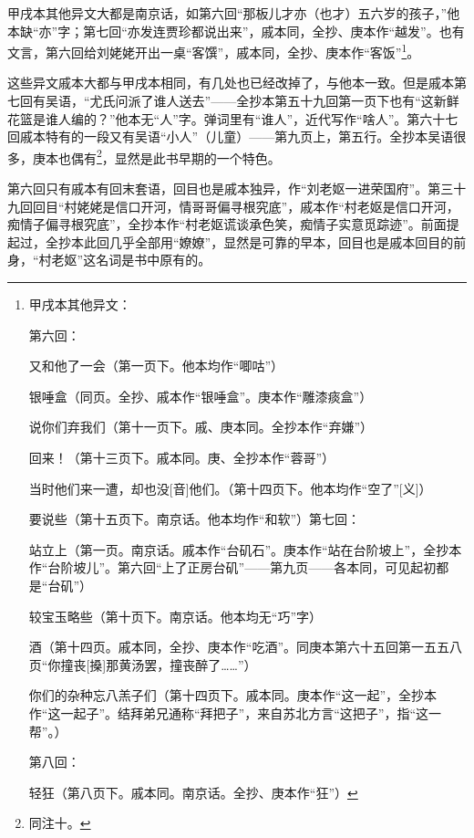 \par 甲戌本其他异文大都是南京话，如第六回“那板儿才亦（也才）五六岁的孩子，”他本缺“亦”字；第七回“亦发连贾珍都说出来”，戚本同，全抄、庚本作“越发”。也有文言，第六回给刘姥姥开出一桌“客馔”，戚本同，全抄、庚本作“客饭”\footnote{甲戌本其他异文：
\par 第六回：
\par 又和他了一会（第一页下。他本均作“唧咕”）
\par 银唾盒（同页。全抄、戚本作“银唾盒”。庚本作“雕漆痰盒”）
\par 说你们弃我们（第十一页下。戚、庚本同。全抄本作“弃嫌”）
\par {}回来！（第十三页下。戚本同。庚、全抄本作“蓉哥”）
\par 当时他们来一遭，却也没[音]他们。（第十四页下。他本均作“空了”[义]）
\par 要说些（第十五页下。南京话。他本均作“和软”）第七回：
\par 站立上（第一页。南京话。戚本作“台矶石”。庚本作“站在台阶坡上”，全抄本作“台阶坡儿”。第六回“上了正房台矶”——第九页——各本同，可见起初都是“台矶”）
\par 较宝玉略些（第十页下。南京话。他本均无“巧”字）
\par {}酒（第十四页。戚本同，全抄、庚本作“吃酒”。同庚本第六十五回第一五五八页“你撞丧[搡]那黄汤罢，撞丧醉了……”）
\par 你们的杂种忘八羔子们（第十四页下。戚本同。庚本作“这一起”，全抄本作“这一起子”。结拜弟兄通称“拜把子”，来自苏北方言“这把子”，指“这一帮”。）
\par 第八回：
\par 轻狂（第八页下。戚本同。南京话。全抄、庚本作“狂”）
}。
\par 这些异文戚本大都与甲戌本相同，有几处也已经改掉了，与他本一致。但是戚本第七回有吴语，“尤氏问派了谁人送去”——全抄本第五十九回第一页下也有“这新鲜花篮是谁人编的？”他本无“人”字。弹词里有“谁人”，近代写作“啥人”。第六十七回戚本特有的一段又有吴语“小人”（儿童）——第九页上，第五行。全抄本吴语很多，庚本也偶有\footnote{同注十。}，显然是此书早期的一个特色。
\par 第六回只有戚本有回末套语，回目也是戚本独异，作“刘老妪一进荣国府”。第三十九回回目“村姥姥是信口开河，情哥哥偏寻根究底”，戚本作“村老妪是信口开河，痴情子偏寻根究底”，全抄本作“村老妪谎谈承色笑，痴情子实意觅踪迹”。前面提起过，全抄本此回几乎全部用“嫽嫽”，显然是可靠的早本，回目也是戚本回目的前身，“村老妪”这名词是书中原有的。
